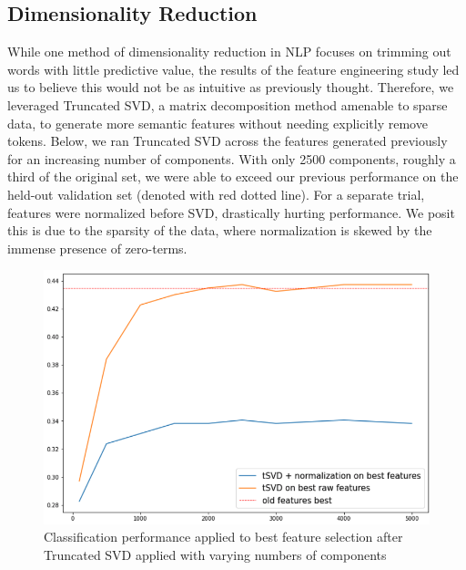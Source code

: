 \documentclass[11pt,a4paper]{article}
\begin{document}
\subsection{Dimensionality Reduction}%
\label{sub:dimensionality_reduction}

While one method of dimensionality reduction in NLP focuses on trimming out words with little predictive value, the results of the feature engineering study led us to believe this would not be as intuitive as previously thought. Therefore, we leveraged Truncated SVD, a matrix decomposition method amenable to sparse data, to generate more semantic features without needing explicitly remove tokens. Below, we ran Truncated SVD across the features generated previously for an increasing number of components. With only 2500 components, roughly a third of the original set, we were able to exceed our previous performance on the held-out validation set (denoted with red dotted line). For a separate trial, features were normalized before SVD, drastically hurting performance. We posit this is due to the sparsity of the data, where normalization is skewed by the immense presence of zero-terms.


\begin{figure}[htpb]
  \centering
  \includegraphics[width=1\linewidth]{imgs/tsvd.png}
  \caption{Classification performance applied to best feature
  selection after Truncated SVD applied with varying numbers of 
 components}%
  \label{fig:tsvd}
\end{figure}
\end{document}

